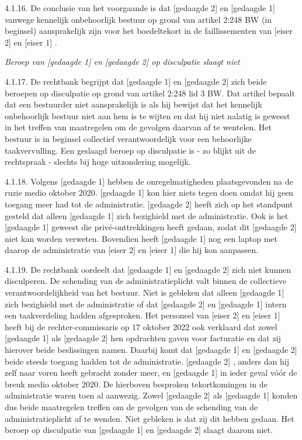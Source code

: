 \documentclass[
  dutch,
  a4paper,
]{article}
\begin{document}
4.1.16. De conclusie van het voorgaande is dat {[}gedaagde 2{]} en {[}gedaagde 1{]} vanwege kennelijk onbehoorlijk bestuur op grond van artikel 2:248 BW (in beginsel) aansprakelijk zijn voor het boedeltekort in de faillissementen van {[}eiser 2{]} en {[}eiser 1{]} .

\emph{Beroep van {[}gedaagde 1{]} en {[}gedaagde 2{]} op disculpatie slaagt niet}

4.1.17. De rechtbank begrijpt dat {[}gedaagde 1{]} en {[}gedaagde 2{]} zich beide beroepen op disculpatie op grond van artikel 2:248 lid 3 BW. Dat artikel bepaalt dat een bestuurder niet aansprakelijk is als hij bewijst dat het kennelijk onbehoorlijk bestuur niet aan hem is te wijten en dat hij niet nalatig is geweest in het treffen van maatregelen om de gevolgen daarvan af te wentelen. Het bestuur is in beginsel collectief verantwoordelijk voor een behoorlijke taakvervulling. Een geslaagd beroep op disculpatie is - zo blijkt uit de rechtspraak - slechts bij hoge uitzondering mogelijk.

4.1.18. Volgens {[}gedaagde 1{]} hebben de onregelmatigheden plaatsgevonden na de ruzie medio oktober 2020. {[}gedaagde 1{]} kon hier niets tegen doen omdat hij geen toegang meer had tot de administratie. {[}gedaagde 2{]} heeft zich op het standpunt gesteld dat alleen {[}gedaagde 1{]} zich bezighield met de administratie. Ook is het {[}gedaagde 1{]} geweest die privé-onttrekkingen heeft gedaan, zodat dit {[}gedaagde 2{]} niet kan worden verweten. Bovendien heeft {[}gedaagde 1{]} nog een laptop met daarop de administratie van {[}eiser 2{]} en {[}eiser 1{]} die hij kon aanpassen.

4.1.19. De rechtbank oordeelt dat {[}gedaagde 1{]} en {[}gedaagde 2{]} zich niet kunnen disculperen. De schending van de administratieplicht valt binnen de collectieve verantwoordelijkheid van het bestuur. Niet is gebleken dat alleen {[}gedaagde 1{]} zich bezighield met de administratie of dat {[}gedaagde 2{]} en {[}gedaagde 1{]} intern een taakverdeling hadden afgesproken. Het personeel van {[}eiser 2{]} en {[}eiser 1{]} heeft bij de rechter-commissaris op 17 oktober 2022 ook verklaard dat zowel {[}gedaagde 1{]} als {[}gedaagde 2{]} hen opdrachten gaven voor facturatie en dat zij hierover beide beslissingen namen. Daarbij komt dat {[}gedaagde 1{]} en {[}gedaagde 2{]} beide steeds toegang hadden tot de administratie. {[}gedaagde 2{]} , anders dan hij zelf naar voren heeft gebracht zonder meer, en {[}gedaagde 1{]} in ieder geval vóór de breuk medio oktober 2020. De hierboven besproken tekortkomingen in de administratie waren toen al aanwezig. Zowel {[}gedaagde 2{]} als {[}gedaagde 1{]} konden dus beide maatregelen treffen om de gevolgen van de schending van de administratieplicht af te wenden. Niet gebleken is dat zij dit hebben gedaan. Het beroep op disculpatie van {[}gedaagde 1{]} en {[}gedaagde 2{]} slaagt daarom niet.
\end{document}
